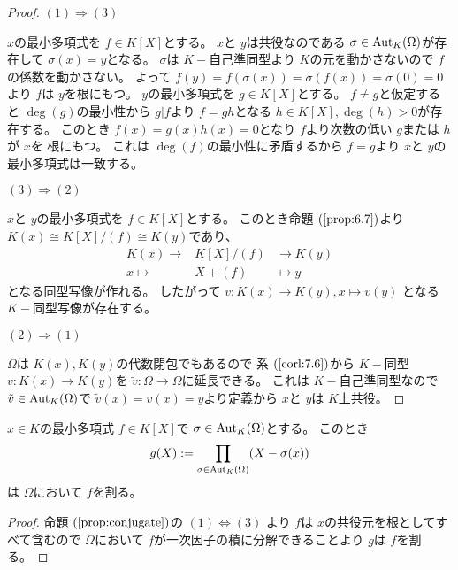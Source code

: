\documentclass[../master_galois_theory]{subfiles}
\begin{document}
\begin{proof}
  $(1) \Rightarrow (3)$

  $x$の最小多項式を $f \in K[X]$とする。
  $x$と $y$は共役なのである $\sigma \in \mathrm{Aut}_K(\Omega)$が存在して
  $\sigma(x) = y$となる。
  $\sigma$は $K-$自己準同型より $K$の元を動かさないので $f$の係数を動かさない。
  よって $f(y) = f(\sigma(x)) = \sigma(f(x)) = \sigma(0) = 0$より
  $f$は $y$を根にもつ。
  $y$の最小多項式を $g \in K[X]$とする。
  $f \neq g$と仮定すると $\deg(g)$の最小性から $g|f$より
  $f = gh$となる $h \in K[X] , \deg(h) > 0$が存在する。
  このとき $f(x) = g(x)h(x) = 0$となり $f$より次数の低い $g$または $h$が $x$を
  根にもつ。
  これは $\deg(f)$の最小性に矛盾するから $f = g$より $x$と $y$の最小多項式は一致する。

  $(3) \Rightarrow (2)$

  $x$と $y$の最小多項式を $f \in K[X]$とする。
  このとき命題 $(\mathrm{\ref{prop:6.7}})$より
  $K(x) \cong K[X]/(f) \cong K(y)$であり、
  \begin{eqnarray*}
    K(x) \longrightarrow & K[X]/(f) & \longrightarrow K(y) \\
    x \longmapsto & X + (f) & \longmapsto y
  \end{eqnarray*}
  となる同型写像が作れる。
  したがって $v : K(x) \longrightarrow K(y) , x \longmapsto v(y)$
  となる $K-$同型写像が存在する。

  $(2) \Rightarrow (1)$

  $\Omega$は $K(x) , K(y)$の代数閉包でもあるので
  系 $(\mathrm{\ref{corl:7.6}})$から $K-$同型 $v : K(x) \longrightarrow K(y)$を
  $\tilde{v} : \Omega \longrightarrow \Omega$に延長できる。
  これは $K-$自己準同型なので $\tilde{v} \in \mathrm{Aut}_K(\Omega)$で
  $\tilde{v}(x) = v(x) = y$より定義から $x$と $y$は $K$上共役。
\end{proof}

\begin{corl}
  $x \in K$の最小多項式 $f \in K[X]$で $\sigma \in \mathrm{Aut}_K(\Omega)$とする。
  このとき
  \begin{eqnarray*}
    g(X) := \prod_{\sigma \in \mathrm{Aut}_K(\Omega)} (X - \sigma(x))
  \end{eqnarray*}
  は $\Omega$において $f$を割る。
  \end{corl}

\begin{proof}
  命題 $(\mathrm{\ref{prop:conjugate}})$の $(1) \Leftrightarrow (3)$
  より $f$は $x$の共役元を根としてすべて含むので $\Omega$において
  $f$が一次因子の積に分解できることより $g$は $f$を割る。
\end{proof}
\end{document}
